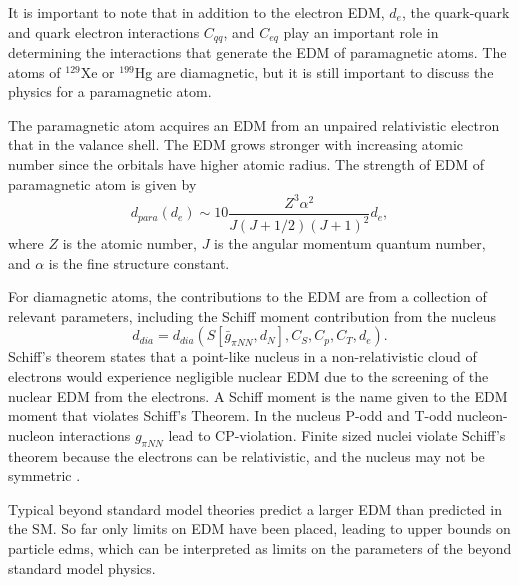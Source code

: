  It is important to note that in addition to the electron EDM, $d_e$, the quark-quark and quark electron interactions $C_{qq}$, and $C_{eq}$ play an important role in determining the interactions that generate the EDM of paramagnetic atoms. The atoms of $^{129}$Xe or $^{199}$Hg are diamagnetic, but it is still important to discuss the physics for a paramagnetic atom. 
 
 The paramagnetic atom acquires an EDM from an unpaired relativistic electron that in the valance shell. The EDM grows stronger with increasing atomic number since the orbitals have higher atomic radius. The strength of EDM of paramagnetic atom is given by
\begin{equation}
    d_{para}(d_e) \sim 10 \frac{Z^3 \alpha^2}{J(J+1/2)(J+1)^2} d_e,
\end{equation}
where $Z$ is the atomic number, $J$ is the angular momentum quantum number, and $\alpha$ is the fine structure constant.

For diamagnetic atoms, the contributions to the  EDM are from a collection of relevant parameters, including the Schiff moment contribution from the nucleus
\begin{equation}
    d_{dia}=d_{dia}(S[\bar{g}_{\pi N N },d_N],C_S,C_p,C_T,d_e).
\end{equation}
Schiff's theorem states that a point-like nucleus in a non-relativistic cloud of electrons would experience negligible nuclear EDM due to the screening of the nuclear EDM from the electrons. A Schiff moment is the name given to the EDM moment that violates Schiff's Theorem. In the nucleus P-odd and T-odd nucleon-nucleon interactions $g_{\pi N N}$ lead to CP-violation. Finite sized nuclei violate Schiff's theorem because the electrons can be relativistic, and the nucleus may not be symmetric \cite{Flambaum, Sushkov}.

Typical beyond standard model theories predict a larger EDM than predicted in the SM. So far only limits on EDM have been placed, leading to upper bounds on particle \gls{edm}s, which can be interpreted as limits on the parameters of the beyond standard model physics.
